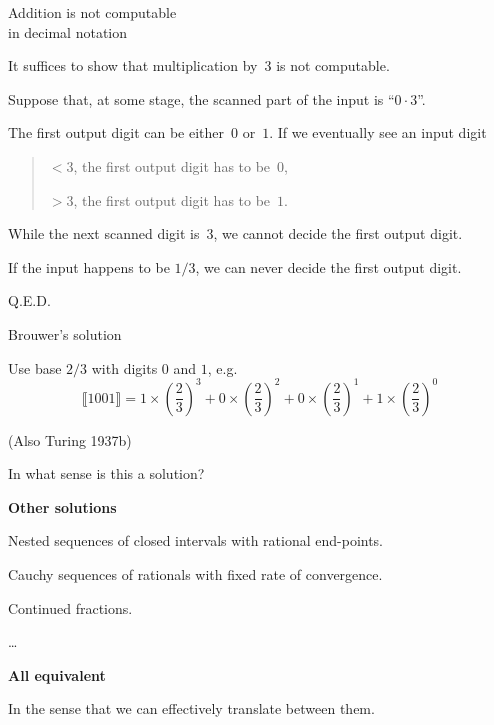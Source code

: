 \documentclass{csslides-1.1}
\newcommand{\sscript}[1]{_{\empty_{#1}}}
\begin{document}
\begin{slide}{Addition is not computable \\ in decimal notation} 

It suffices to show that multiplication by~$3$ is not computable.

\vfill

Suppose that, at some stage, the scanned part of the input is
``$0 \cdot 3$''.

\vfill

The first output digit can be either~$0$ or~$1$.
If we eventually see an input digit
\begin{quote}
 $<3$, the first output digit has to be~$0$,

 $>3$, the first output digit has to be~$1$.
\end{quote}
\vfill

While the next scanned digit is~$3$, we cannot decide the first output
digit.

\vfill

If the input happens to be $1/3$, we can never decide the first output
digit. 

Q.E.D.

\vfill

\end{slide}

\begin{slide}{Brouwer's  solution}

Use base $2/3$ with digits $0$ and $1$, e.g.
\[
\llbracket 1001 \rrbracket 
= 1 \times \left(\frac{2}{3}\right)^{3}
+ 0 \times \left(\frac{2}{3}\right)^{2}
+ 0 \times \left(\frac{2}{3}\right)^{1}
+ 1 \times \left(\frac{2}{3}\right)^{0}
\]

\rrbracket

(Also Turing 1937b)

\vfill

In what sense is this a solution?

\vfill

{\bf Other solutions}
\vfill

Nested sequences of closed intervals with rational end-points.

\vfill

Cauchy sequences of rationals with fixed rate of convergence.

\vfill

Continued fractions.

\vfill

\dots

\vfill

{\bf All equivalent}

In the sense that we can effectively translate between them.

\vfill

\end{slide}
\end{document}
